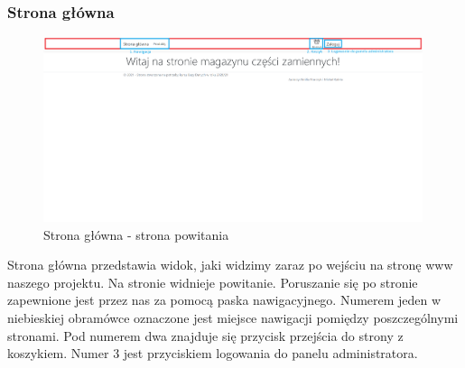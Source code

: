 \documentclass{article}
\begin{document}
\subsubsection{Strona główna}
\begin{figure}[H]
   \centering
   \includegraphics[width=0.99\textwidth,frame]{Wyglad/powitanie_uzytkownik.png}
   \caption{Strona główna - strona powitania}
\end{figure}
Strona główna przedstawia widok, jaki widzimy zaraz po wejściu na stronę www naszego projektu.
Na stronie widnieje powitanie. Poruszanie się po stronie zapewnione jest przez nas za pomocą paska
nawigacyjnego. Numerem jeden w niebieskiej obramówce oznaczone jest miejsce nawigacji pomiędzy
poszczególnymi stronami. Pod numerem dwa znajduje się przycisk przejścia do strony z koszykiem.
Numer 3 jest przyciskiem logowania do panelu administratora.
\end{document}
